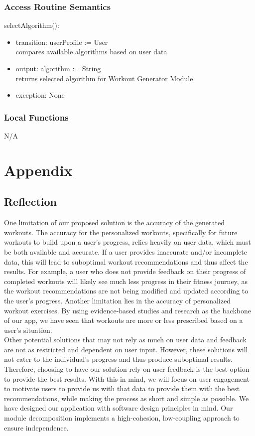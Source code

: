 \documentclass[12pt, titlepage]{article}
\begin{document}
\subsubsection{Access Routine Semantics}

\noindent selectAlgorithm():
\begin{itemize}
\item transition: userProfile := User \\
compares available algorithms based on user data
\item output: algorithm := String \\
returns selected algorithm for Workout Generator Module
\item exception: None
\end{itemize}


\subsubsection{Local Functions}
N/A

\newpage



\section{Appendix} \label{Appendix}

\subsection{Reflection}
One limitation of our proposed solution is the accuracy of the generated workouts. The accuracy for the personalized workouts, specifically for future workouts to build upon a user’s progress, relies heavily on user data, which must be both available and accurate. If a user provides inaccurate and/or incomplete data, this will lead to suboptimal workout recommendations and thus affect the results. For example, a user who does not provide feedback on their progress of completed workouts will likely see much less progress in their fitness journey, as the workout recommendations are not being modified and updated according to the user’s progress. Another limitation lies in the accuracy of personalized workout exercises. By using evidence-based studies and research as the backbone of our app, we have seen that workouts are more or less prescribed based on a user’s situation. \\

Other potential solutions that may not rely as much on user data and feedback are not as restricted and dependent on user input. However, these solutions will not cater to the individual’s progress and thus produce suboptimal results. Therefore, choosing to have our solution rely on user feedback is the best option to provide the best results. With this in mind, we will focus on user engagement to motivate users to provide us with that data to provide them with the best recommendations, while making the process as short and simple as possible.  We have designed our application with software design principles in mind. Our module decomposition implements a high-cohesion, low-coupling approach to ensure independence. 
\end{document}
